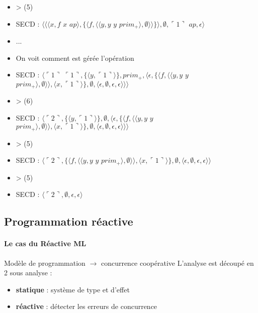 \documentclass[10pt,a4paper]{article}
\begin{document}
\begin{itemize}
					\item[] > (5)
					\item[] SECD : $\langle\langle\langle x,f$ $x$ $ap\rangle,\{\langle f,\langle\langle y,y$ $y$ $prim_{+}\rangle,\emptyset\rangle\rangle\}\rangle,\emptyset,\ulcorner 1\urcorner$ $ap,\epsilon\rangle$
					\item[] ...
					\item[] On voit comment est gérée l'opération
					\item[] SECD : $\langle\ulcorner 1\urcorner$ $\ulcorner 1\urcorner,\{\langle y,\ulcorner 1\urcorner\rangle\},prim_{+},\langle\epsilon,\{\langle f,\langle\langle y,y$ $y$ $prim_{+}\rangle,\emptyset\rangle\rangle,\langle x,\ulcorner 1\urcorner\rangle\} ,\emptyset,\langle\epsilon,\emptyset,\epsilon,\epsilon\rangle\rangle\rangle$
					\item[] > (6)
					\item[] SECD : $\langle\ulcorner 2\urcorner,\{\langle y,\ulcorner 1\urcorner\rangle\},\emptyset,\langle\epsilon,\{\langle f,\langle\langle y,y$ $y$ $prim_{+}\rangle,\emptyset\rangle\rangle,\langle x,\ulcorner 1\urcorner\rangle\} ,\emptyset,\langle\epsilon,\emptyset,\epsilon,\epsilon\rangle\rangle\rangle$
					\item[] > (5)
					\item[] SECD : $\langle\ulcorner 2\urcorner,\{\langle f,\langle\langle y,y$ $y$ $prim_{+}\rangle,\emptyset\rangle\rangle,\langle x,\ulcorner 1\urcorner\rangle\} ,\emptyset,\langle\epsilon,\emptyset,\epsilon,\epsilon\rangle\rangle$
					\item[] > (5)
					\item[] SECD : $\langle\ulcorner 2\urcorner,\emptyset,\epsilon,\epsilon\rangle$
				\end{itemize}
				\newpage
				


		\subsection{Programmation réactive}
		
			\paragraph{Le cas du Réactive ML}
				Modèle de programmation $\longrightarrow$ concurrence coopérative 
				\smallbreak
				L'analyse est découpé en 2 sous analyse :
				\begin{itemize}
					\item \textbf{statique} : système de type et d'effet
					\item \textbf{réactive} : détecter les erreurs de concurrence
				\end{itemize}
				\bigbreak
				
\end{document}
